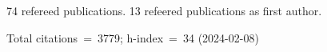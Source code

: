 74 refereed publications. 13 refeered publications as first author.

Total citations~=~3779; h-index~=~34 (2024-02-08)